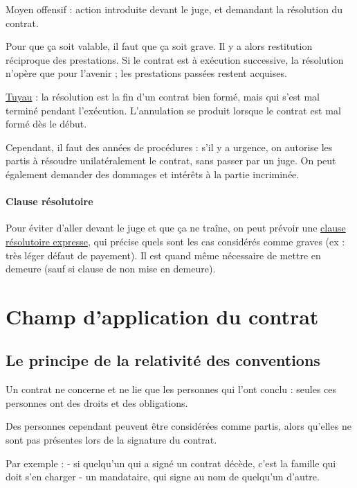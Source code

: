 				Moyen offensif : action introduite devant le juge, et demandant la résolution du contrat.
				
				Pour que ça soit valable, il faut que ça soit grave. Il y a alors restitution réciproque des prestations. Si le contrat est à exécution successive, la résolution n'opère que pour l'avenir ; les prestations passées restent acquises.
				
				\underline{Tuyau} : la résolution est la fin d'un contrat bien formé, mais qui s'est mal terminé pendant l'exécution. L'annulation se produit lorsque le contrat est  mal formé dès le début.
				
				Cependant, il faut des années de procédures : s'il y a urgence, on autorise les partis à résoudre unilatéralement le contrat, sans passer par un juge. On peut également demander des dommages et intérêts à la partie incriminée.
			
			
			
				\paragraph{Clause résolutoire}
			
			Pour éviter d'aller devant le juge et que ça ne traîne, on peut prévoir une \underline{clause résolutoire expresse}, qui précise quels sont les cas considérés comme graves (ex : très léger défaut de payement). Il est quand même nécessaire de mettre en demeure (sauf si clause de non mise en demeure).

			
	\section{Champ d'application du contrat}
	
		\subsection{Le principe de la relativité des conventions}
		
		Un contrat ne concerne et ne lie que les personnes qui l'ont conclu : seules ces personnes ont des droits et des obligations.
		
		Des personnes cependant peuvent être considérées comme partis, alors qu'elles ne sont pas présentes lors de la signature du contrat. 
		
		Par exemple : - si quelqu'un qui a signé un contrat décède, c'est la famille qui doit s'en charger - un mandataire, qui signe au nom de quelqu'un d'autre.
		
